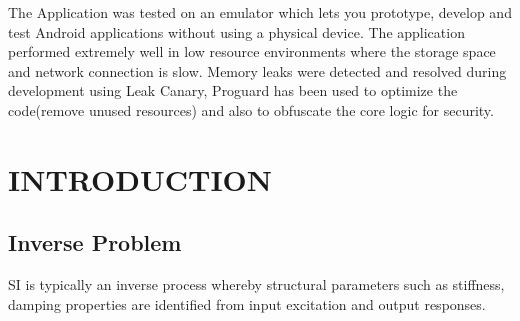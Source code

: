 \documentclass[BTech]{srmuthesis}
\begin{document}
The Application was tested on an emulator which lets you prototype, develop and test Android applications without using a physical device. The application performed extremely well in low resource environments where the storage space and network connection is slow. Memory leaks were detected and resolved during development using Leak Canary, Proguard has been used to optimize the code(remove unused resources) and also to obfuscate the core logic for security.


\chapter{INTRODUCTION}
\label{chap:intro}
\section{Inverse Problem}
\ac{SI} is typically an inverse process whereby structural parameters such as stiffness, damping properties are identified from input excitation and output responses.
\end{document}
